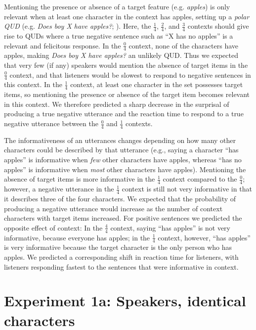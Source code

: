 \documentclass[man, floatsintext, noapacite]{apa6}
\begin{document}
Mentioning the presence or absence of a target feature (e.g. \textit{apples}) is only relevant when at least one character in the context has apples, setting up a \textit{polar QUD} (e.g. \textit{Does boy X have apples?}; ). Here, the $\frac{1}{4}$, $\frac{2}{4}$, and $\frac{3}{4}$ contexts should give rise to QUDs where a true negative sentence such as ``X has no apples'' is a relevant and felicitous response. In the $\frac{0}{4}$ context, none of the characters have apples, making \textit{Does boy X have apples?} an unlikely QUD. Thus we expected that very few (if any) speakers would mention the absence of target items in the $\frac{0}{4}$ context, and that listeners would be slowest to respond to negative sentences in this context. In the $\frac{1}{4}$ context, at least one character in the set possesses target items, so mentioning the presence or absence of the target item becomes relevant in this context. We therefore predicted a sharp decrease in the surprisal of producing a true negative utterance and the reaction time to respond to a true negative utterance between the $\frac{0}{4}$ and $\frac{1}{4}$ contexts.

The informativeness of an utterances changes depending on how many other characters could be described by that utterance (e.g., saying a character ``has apples'' is informative when \textit{few} other characters have apples, whereas ``has no apples'' is informative when \textit{most} other characters have apples). Mentioning the absence of target items is more informative in the $\frac{1}{4}$  context compared to the $\frac{0}{4}$;  however, a negative utterance in the $\frac{1}{4}$ context is still not very informative in that it describes three of the four characters. We expected that the probability of producing a negative utterance would increase as the number of context characters with target items increased. For positive sentences we predicted the opposite effect of context: In the $\frac{4}{4}$ context, saying ``has apples'' is not very informative, because everyone has apples; in the $\frac{1}{4}$ context, however, ``has apples'' is very informative because the target character is the only person who has apples. We predicted a corresponding shift in reaction time for listeners, with listeners responding fastest to the sentences that were informative in context.

\section{Experiment 1a: Speakers, identical characters}
\end{document}
